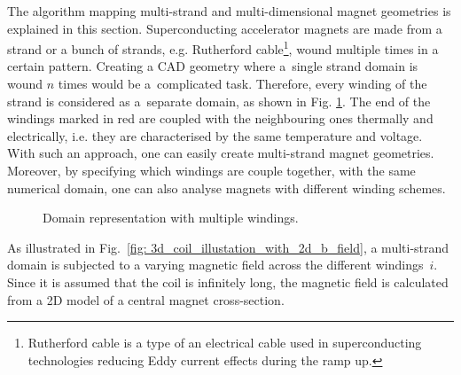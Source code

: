 
The algorithm mapping multi-strand and multi-dimensional magnet geometries is explained in this section. Superconducting accelerator magnets are made from a strand or a bunch of strands, e.g. Rutherford cable\footnote{Rutherford cable is a type of an electrical cable used in superconducting technologies reducing Eddy current effects during the ramp up.}, wound multiple times in a certain pattern. Creating a CAD geometry where a~single strand domain is wound $n$ times would be a~complicated task. Therefore, every winding of the strand is considered as a~separate domain, as shown in Fig. \ref{fig:winding_geom_scheme}. The end of the windings marked in red are coupled with the neighbouring ones thermally and electrically, i.e. they are characterised by the same temperature and voltage. With such an approach, one can easily create multi-strand magnet geometries. Moreover, by specifying which windings are couple together, with the same numerical domain, one can also analyse magnets with different winding schemes.

\begin{figure}[H]
\centering
{}
\caption{Domain representation with multiple windings.}
\label{fig:winding_geom_scheme}
\end{figure}

As illustrated in Fig.~\ref{fig: 3d_coil_illustation_with_2d_b_field}, a multi-strand domain is subjected to a varying magnetic field across the different windings~$i$. Since it is assumed that the coil is infinitely long, the magnetic field is calculated from a 2D model of a central magnet cross-section. 

